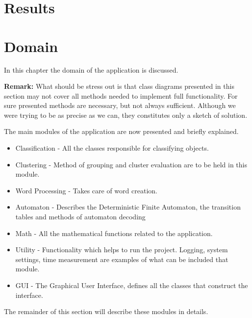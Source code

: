 \documentclass{mini}
\begin{document}
\chapter{Results}\label{chap:results}

\chapter{Domain} \label{chap:domain}
In this chapter the domain of the application is discussed. 

\textbf{Remark:} What should be stress out is that class diagrams presented in this section may not cover all methods needed to implement full functionality. For sure presented methods are necessary, but not always sufficient. Although we were trying to be as precise as we can, they constitutes only a sketch of solution.

The main modules of the application are now presented and briefly explained.

\begin{itemize}
    
    \item 
    {{Classification}} - All the classes responsible for classifying objects.
    \item 
    {{Clustering}} - Method of grouping and cluster evaluation are to be held in this module.
    \item
    {{Word Processing}} - Takes care of word creation.
    \item 
    {{Automaton}} - Describes the Deterministic Finite Automaton, the transition tables and methods of automaton decoding 
    \item 
    {{Math}} - All the mathematical functions related to the application.
    \item 
    {{Utility}} - Functionality which helps to run the project. Logging, system settings, time measurement are examples of what can be included that module.
    \item 
    {{GUI}} - The Graphical User Interface, defines all the classes that construct the interface.
    
\end{itemize}

The remainder of this section will describe these modules in details.

\end{document}
